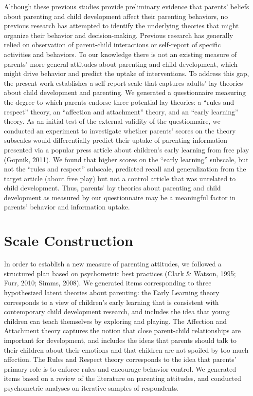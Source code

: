 \documentclass[10pt, letterpaper]{article}
\begin{document}
Although these previous studies provide preliminary evidence that
parents' beliefs about parenting and child development affect their
parenting behaviors, no previous research has attempted to identify the
underlying theories that might organize their behavior and
decision-making. Previous research has generally relied on observation
of parent-child interactions or self-report of specific activities and
behaviors. To our knowledge there is not an existing measure of parents'
more general attitudes about parenting and child development, which
might drive behavior and predict the uptake of interventions. To address
this gap, the present work establishes a self-report scale that captures
adults' lay theories about child development and parenting. We generated
a questionnaire measuring the degree to which parents endorse three
potential lay theories: a ``rules and respect'' theory, an ``affection
and attachment'' theory, and an ``early learning'' theory. As an initial
test of the external validity of the questionnaire, we conducted an
experiment to investigate whether parents' scores on the theory
subscales would differentially predict their uptake of parenting
information presented via a popular press article about children's early
learning from free play (Gopnik, 2011). We found that higher scores on
the ``early learning'' subscale, but not the ``rules and respect''
subscale, predicted recall and generalization from the target article
(about free play) but not a control article that was unrelated to child
development. Thus, parents' lay theories about parenting and child
development as measured by our questionnaire may be a meaningful factor
in parents' behavior and information uptake.

\section{Scale Construction}\label{scale-construction}

In order to establish a new measure of parenting attitudes, we followed
a structured plan based on psychometric best practices (Clark \& Watson,
1995; Furr, 2010; Simms, 2008). We generated items corresponding to
three hypothesized latent theories about parenting: the Early Learning
theory corresponds to a view of children's early learning that is
consistent with contemporary child development research, and includes
the idea that young children can teach themselves by exploring and
playing. The Affection and Attachment theory captures the notion that
close parent-child relationships are important for development, and
includes the ideas that parents should talk to their children about
their emotions and that children are not spoiled by too much affection.
The Rules and Respect theory corresponds to the idea that parents'
primary role is to enforce rules and encourage behavior control. We
generated items based on a review of the literature on parenting
attitudes, and conducted psychometric analyses on iterative samples of
respondents.
\end{document}
